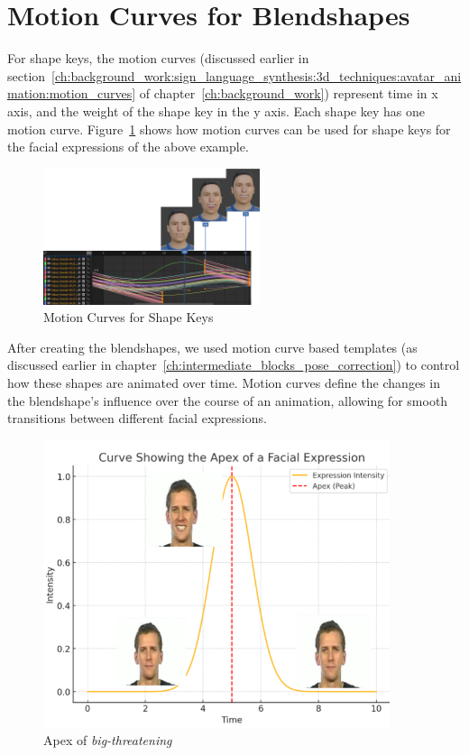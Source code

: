 \documentclass[../../main]{subfiles}
\begin{document}
\section{Motion Curves for Blendshapes}
\label{ch:facial_expressions:motion_curves_for_blendshapes}

For shape keys, the motion curves (discussed earlier in section~\ref{ch:background_work:sign_language_synthesis:3d_techniques:avatar_animation:motion_curves} of chapter~\ref{ch:background_work}) represent time in x axis, and the weight of the shape key in the y axis. Each shape key has one motion curve. Figure~\ref{fig:motion_curves_shape_keys} shows how motion curves can be used for shape keys for the facial expressions of the above example.

\begin{figure}[h]
    \centering \includegraphics[width = 2.5in]{chapters/intermediate_blocks_pose_correction/images/motion_curves_shape_keys.png}
    \caption{Motion Curves for Shape Keys}
    \label{fig:motion_curves_shape_keys}
\end{figure}

After creating the blendshapes, we used motion curve based templates (as discussed earlier in chapter~\ref{ch:intermediate_blocks_pose_correction}) to control how these shapes are animated over time. Motion curves define the changes in the blendshape's influence over the course of an animation, allowing for smooth transitions between different facial expressions.

\begin{figure}[h]
    \centering \includegraphics[width = 4in]{chapters/facial_expressions/images/motion_curve_apex.png}
    \caption{Apex of \emph{big-threatening}}
    \label{ch:facial_expressions:fig:motion_curve_apex}
\end{figure}
\end{document}
